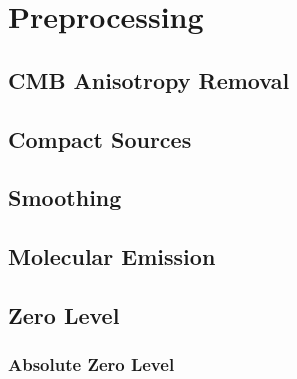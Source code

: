\documentclass{emulateapj}
\begin{document}
\section{Preprocessing}
\label{sec:prepro}

\subsection{CMB Anisotropy Removal}
\label{sec:cmb}

\subsection{Compact Sources}
\label{sec:ptsrc}

\subsection{Smoothing}
\label{sec:smth}

\subsection{Molecular Emission}
\label{sec:mole}

\subsection{Zero Level}
\label{sec:zp}

\subsubsection{Absolute Zero Level}
\label{sec:zp_abs}
\end{document}
